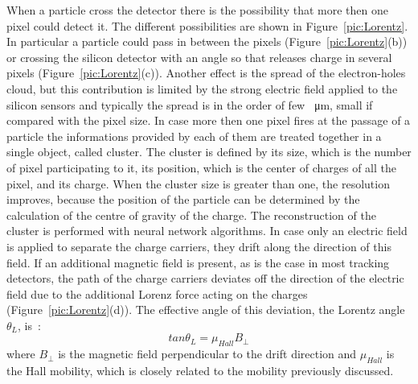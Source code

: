 When a particle cross the detector there is the possibility that more then one pixel could detect it. The different possibilities are shown in Figure~\ref{pic:Lorentz}. In particular a particle could pass in between the pixels (Figure~\ref{pic:Lorentz}(b)) or crossing the silicon detector with an angle so that releases charge in several pixels (Figure~\ref{pic:Lorentz}(c)). Another effect is the spread of the electron-holes cloud, but this contribution is limited by the strong electric field applied to the silicon sensors and typically the spread is in the order of few \SI{}{\micro\meter}, small if compared with the pixel size.
In case more then one pixel fires at the passage of a particle the informations provided by each of them are treated together in a single object, called cluster. The cluster is defined by its size, which is the number of pixel participating to it, its position, which is the center of charges of all the pixel, and its charge. %
When the cluster size is greater than one, the resolution improves, because the position of the particle can be determined by the calculation of the centre of gravity of the charge. The reconstruction of the cluster is performed with neural network algorithms.
In case only an electric field is applied to separate the charge carriers, they drift along the direction of this field. If an additional magnetic field is present, as is the case in most tracking detectors, the path of the charge carriers deviates off the direction of the electric field due to the additional Lorenz force acting on the charges (Figure~\ref{pic:Lorentz}(d)). The effective angle of this deviation, the Lorentz angle $\theta_L$, is~\cite{Joern_27}:
\begin{equation}
tan\theta_L=\mu_{Hall}B_{\bot}
\end{equation}
where $B_{\bot}$ is the magnetic field perpendicular to the drift direction and $\mu_{Hall}$ is the Hall mobility, which is closely related to the mobility previously discussed.
